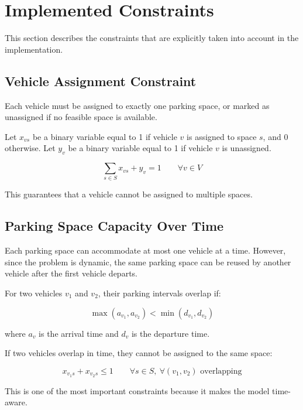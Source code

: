 \documentclass[12pt,a4paper]{article}
\begin{document}
\section{Implemented Constraints}

This section describes the constraints that are explicitly taken into account in the implementation.

\subsection{Vehicle Assignment Constraint}

Each vehicle must be assigned to exactly one parking space, or marked as unassigned if no feasible space is available.

Let $x_{vs}$ be a binary variable equal to 1 if vehicle $v$ is assigned to space $s$, and 0 otherwise. Let $y_v$ be a binary variable equal to 1 if vehicle $v$ is unassigned.

\begin{equation}
\sum_{s \in S} x_{vs} + y_v = 1 \qquad \forall v \in V
\end{equation}

This guarantees that a vehicle cannot be assigned to multiple spaces.

\subsection{Parking Space Capacity Over Time}

Each parking space can accommodate at most one vehicle at a time. However, since the problem is dynamic, the same parking space can be reused by another vehicle after the first vehicle departs.

For two vehicles $v_1$ and $v_2$, their parking intervals overlap if:

\begin{equation}
\max(a_{v_1}, a_{v_2}) < \min(d_{v_1}, d_{v_2})
\end{equation}

where $a_v$ is the arrival time and $d_v$ is the departure time.

If two vehicles overlap in time, they cannot be assigned to the same space:

\begin{equation}
x_{v_1s} + x_{v_2s} \leq 1
\qquad
\forall s \in S,\ \forall (v_1,v_2) \text{ overlapping}
\end{equation}

This is one of the most important constraints because it makes the model time-aware.
\end{document}
